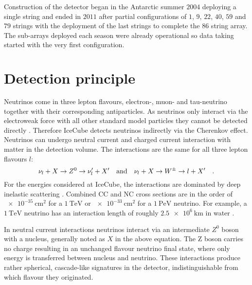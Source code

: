 Construction of the detector began in the Antarctic summer $\num{2004}$ deploying a single string and ended in $\num{2011}$ after partial configurations of $\num{1}$, $\num{9}$, $\num{22}$, $\num{40}$, $\num{59}$ and $\num{79}$ strings with the deployment of the last strings to complete the $\num{86}$ string array.
The sub-arrays deployed each season were already operational so data taking started with the very first configuration.

\section{Detection principle}
Neutrinos come in three lepton flavours, electron-, muon- and tau-neutrino together with their corresponding antiparticles.
As neutrinos only interact via the electroweak force with all other standard model particles they cannot be detected directly .
Therefore IceCube detects neutrinos indirectly via the Cherenkov effect.
Neutrinos can undergo neutral current and charged current interaction with matter in the detection volume.
The interactions are the same for all three lepton flavours $l$:
\begin{equation}
  \nu_l + X \rightarrow Z^0 \rightarrow \nu'_l + X'
  \quad\text{and}\quad
  \nu_l + X \rightarrow W^{\pm} \rightarrow l + X'
  \quad\text{.}
\end{equation}
For the energies considered at IceCube, the interactions are dominated by deep inelastic scattering .
Combined CC and NC cross sections are in the order of $\SI{e-35}{\cm\squared}$ for a $\SI{1}{\TeV}$ or $\SI{e-33}{\cm\squared}$ for a $\SI{1}{\peta\eV}$ neutrino.
For example, a $\SI{1}{\TeV}$ neutrino has an interaction length of roughly $\SI{2.5e6}{\km}$ in water .

In neutral current interactions neutrinos interact via an intermediate $Z^0$ boson with a nucleus, generally noted as $X$ in the above equation.
The Z boson carries no charge resulting in an unchanged flavour neutrino final state, where only energy is transferred between nucleus and neutrino.
These interactions produce rather spherical, cascade-like signatures in the detector, indistinguishable from which flavour they originated.

